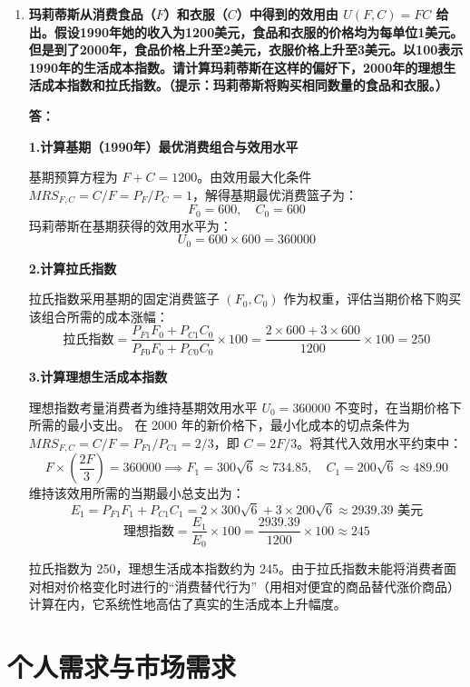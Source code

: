\begin{enumerate}[label=\textbf{\arabic*.}, leftmargin=*]
				\newpage
				\item \textbf{玛莉蒂斯从消费食品（$F$）和衣服（$C$）中得到的效用由 $U(F,C)=FC$ 给出。假设1990年她的收入为1200美元，食品和衣服的价格均为每单位1美元。但是到了2000年，食品价格上升至2美元，衣服价格上升至3美元。以100表示1990年的生活成本指数。请计算玛莉蒂斯在这样的偏好下，2000年的理想生活成本指数和拉氏指数。（提示：玛莉蒂斯将购买相同数量的食品和衣服。）}
				
				\textbf{答：}
				
				\textbf{1.计算基期（1990年）最优消费组合与效用水平}
				
				基期预算方程为 $F + C = 1200$。由效用最大化条件 $MRS_{F,C} = C/F = P_F/P_C = 1$，解得基期最优消费篮子为：
				$$ F_0 = 600, \quad C_0 = 600 $$
				玛莉蒂斯在基期获得的效用水平为：
				$$ U_0 = 600 \times 600 = 360000 $$
				
				\textbf{2.计算拉氏指数}
				
				拉氏指数采用基期的固定消费篮子 $(F_0, C_0)$ 作为权重，评估当期价格下购买该组合所需的成本涨幅：
				$$ \text{拉氏指数} = \frac{P_{F1}F_0 + P_{C1}C_0}{P_{F0}F_0 + P_{C0}C_0} \times 100 = \frac{2 \times 600 + 3 \times 600}{1200} \times 100 = 250 $$
				
				\textbf{3.计算理想生活成本指数}
				
				理想指数考量消费者为维持基期效用水平 $U_0 = 360000$ 不变时，在当期价格下所需的最小支出。
				在 2000 年的新价格下，最小化成本的切点条件为 $MRS_{F,C} = C/F = P_{F1}/P_{C1} = 2/3$，即 $C = 2F/3$。将其代入效用水平约束中：
				$$ F \times \left( \frac{2F}{3} \right) = 360000 \implies F_1 = 300\sqrt{6} \approx 734.85, \quad C_1 = 200\sqrt{6} \approx 489.90 $$
				维持该效用所需的当期最小总支出为：
				$$ E_1 = P_{F1}F_1 + P_{C1}C_1 = 2 \times 300\sqrt{6} + 3 \times 200\sqrt{6} \approx 2939.39 \text{ 美元} $$
				$$ \text{理想指数} = \frac{E_1}{E_0} \times 100 = \frac{2939.39}{1200} \times 100 \approx 245 $$
				
				拉氏指数为 250，理想生活成本指数约为 245。由于拉氏指数未能将消费者面对相对价格变化时进行的“消费替代行为”（用相对便宜的商品替代涨价商品）计算在内，它系统性地高估了真实的生活成本上升幅度。
		
		\end{enumerate}
	\chapter{个人需求与市场需求}
	
